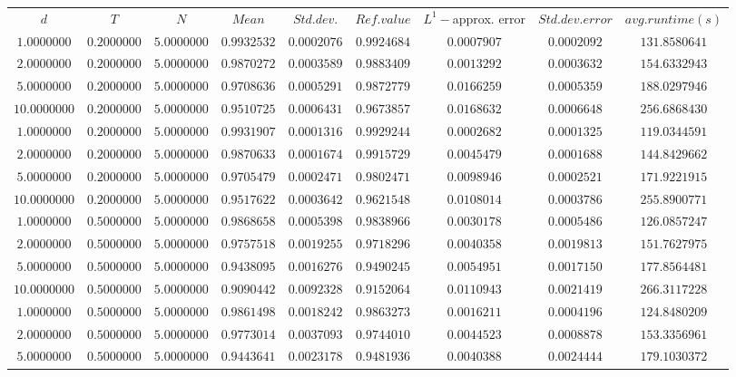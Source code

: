 \begin{tabular}{ccccccccc}
$d$ & $T$ & $N$ & $Mean$ & $Std. dev.$ & $Ref. value$ & $L^1-$approx. error & $Std. dev. error$ & $avg. runtime (s)$\\
$1.0000000$ & $0.2000000$ & $5.0000000$ & $0.9932532$ & $0.0002076$ & $0.9924684$ & $0.0007907$ & $0.0002092$ & $131.8580641$\\
$2.0000000$ & $0.2000000$ & $5.0000000$ & $0.9870272$ & $0.0003589$ & $0.9883409$ & $0.0013292$ & $0.0003632$ & $154.6332943$\\
$5.0000000$ & $0.2000000$ & $5.0000000$ & $0.9708636$ & $0.0005291$ & $0.9872779$ & $0.0166259$ & $0.0005359$ & $188.0297946$\\
$10.0000000$ & $0.2000000$ & $5.0000000$ & $0.9510725$ & $0.0006431$ & $0.9673857$ & $0.0168632$ & $0.0006648$ & $256.6868430$\\
$1.0000000$ & $0.2000000$ & $5.0000000$ & $0.9931907$ & $0.0001316$ & $0.9929244$ & $0.0002682$ & $0.0001325$ & $119.0344591$\\
$2.0000000$ & $0.2000000$ & $5.0000000$ & $0.9870633$ & $0.0001674$ & $0.9915729$ & $0.0045479$ & $0.0001688$ & $144.8429662$\\
$5.0000000$ & $0.2000000$ & $5.0000000$ & $0.9705479$ & $0.0002471$ & $0.9802471$ & $0.0098946$ & $0.0002521$ & $171.9221915$\\
$10.0000000$ & $0.2000000$ & $5.0000000$ & $0.9517622$ & $0.0003642$ & $0.9621548$ & $0.0108014$ & $0.0003786$ & $255.8900771$\\
$1.0000000$ & $0.5000000$ & $5.0000000$ & $0.9868658$ & $0.0005398$ & $0.9838966$ & $0.0030178$ & $0.0005486$ & $126.0857247$\\
$2.0000000$ & $0.5000000$ & $5.0000000$ & $0.9757518$ & $0.0019255$ & $0.9718296$ & $0.0040358$ & $0.0019813$ & $151.7627975$\\
$5.0000000$ & $0.5000000$ & $5.0000000$ & $0.9438095$ & $0.0016276$ & $0.9490245$ & $0.0054951$ & $0.0017150$ & $177.8564481$\\
$10.0000000$ & $0.5000000$ & $5.0000000$ & $0.9090442$ & $0.0092328$ & $0.9152064$ & $0.0110943$ & $0.0021419$ & $266.3117228$\\
$1.0000000$ & $0.5000000$ & $5.0000000$ & $0.9861498$ & $0.0018242$ & $0.9863273$ & $0.0016211$ & $0.0004196$ & $124.8480209$\\
$2.0000000$ & $0.5000000$ & $5.0000000$ & $0.9773014$ & $0.0037093$ & $0.9744010$ & $0.0044523$ & $0.0008878$ & $153.3356961$\\
$5.0000000$ & $0.5000000$ & $5.0000000$ & $0.9443641$ & $0.0023178$ & $0.9481936$ & $0.0040388$ & $0.0024444$ & $179.1030372$\\

\end{tabular}
